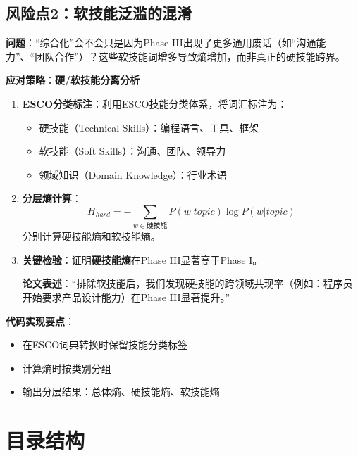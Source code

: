 \documentclass[12pt, a4paper]{ctexart}
\newenvironment{warning}{%
  \begin{tcolorbox}[colback=red!5, colframe=red!50!black, boxrule=0.5pt, arc=2pt, breakable, title=\textbf{注意}]
}{%
  \end{tcolorbox}
}
\begin{document}
\subsection{风险点2：软技能泛滥的混淆}

\begin{warning}
\textbf{问题}：``综合化''会不会只是因为Phase III出现了更多通用废话（如``沟通能力''、``团队合作''）？这些软技能词增多导致熵增加，而非真正的硬技能跨界。
\end{warning}

\textbf{应对策略}：\textbf{硬/软技能分离分析}

\begin{enumerate}
    \item \textbf{ESCO分类标注}：利用ESCO技能分类体系，将词汇标注为：
    \begin{itemize}
        \item 硬技能（Technical Skills）：编程语言、工具、框架
        \item 软技能（Soft Skills）：沟通、团队、领导力
        \item 领域知识（Domain Knowledge）：行业术语
    \end{itemize}

    \item \textbf{分层熵计算}：
    \[
    H_{hard} = -\sum_{w \in \text{硬技能}} P(w|topic) \log P(w|topic)
    \]
    分别计算硬技能熵和软技能熵。

    \item \textbf{关键检验}：证明\textbf{硬技能熵}在Phase III显著高于Phase I。

    \textbf{论文表述}：``排除软技能后，我们发现硬技能的跨领域共现率（例如：程序员开始要求产品设计能力）在Phase III显著提升。''
\end{enumerate}

\textbf{代码实现要点}：
\begin{itemize}
    \item 在ESCO词典转换时保留技能分类标签
    \item 计算熵时按类别分组
    \item 输出分层结果：总体熵、硬技能熵、软技能熵
\end{itemize}

\section{目录结构}
\end{document}
